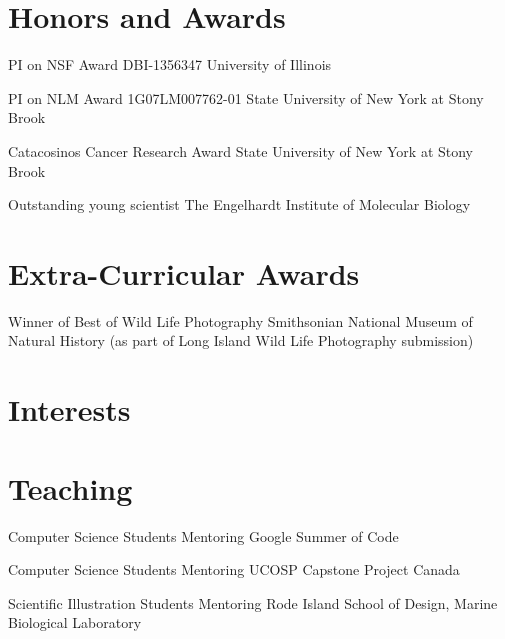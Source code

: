 \documentclass[11pt,letterpaper,sans]{moderncv} %
\begin{document}
\newpage
\section{Honors and Awards}

{PI on NSF Award DBI-1356347}
{University of Illinois}

{PI on NLM Award 1G07LM007762-01}
{State University of New York at Stony Brook}

{Catacosinos Cancer Research Award}
{State University of New York at Stony Brook}

{Outstanding young scientist}
{The Engelhardt Institute of Molecular Biology}

\section{Extra-Curricular Awards}

{Winner of Best of Wild Life Photography}
{Smithsonian National Museum of Natural History (as part of Long Island Wild Life Photography submission)}


\section{Interests}

\renewcommand{\listitemsymbol}{-~} %


\section{Teaching}

{Computer Science Students Mentoring}
{Google Summer of Code}

{Computer Science Students Mentoring}
{UCOSP Capstone Project Canada}

{Scientific Illustration Students Mentoring}
{Rode Island School of Design, Marine Biological Laboratory}
\end{document}
